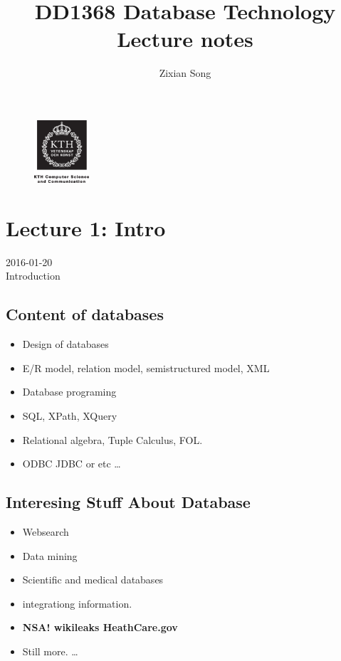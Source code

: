 \documentclass[a4paper]{article}
\title{DD1368 Database Technology Lecture notes}
\author{Zixian Song}
\begin{document}
\maketitle

\begin{figure}[b] 
\centering 
\includegraphics[width=2.045cm,height=2.335cm]{kth_svv_comp_science.eps}
\end{figure}
\newpage
\tableofcontents
\newpage

\section{Lecture 1: Intro}
2016-01-20 \\
    Introduction
    \subsection{Content of databases}
        \begin{itemize}
            \item Design of databases 
            \item E/R  model, relation model, semistructured model, XML
  
        \item Database programing 
        \item SQL, XPath, XQuery 
        \item Relational algebra, Tuple Calculus, FOL. 
        \item ODBC JDBC or etc \ldots
        \end{itemize}
    \subsection{Interesing Stuff About Database}
        \begin{itemize}
            \item Websearch 
            \item Data mining 
            \item Scientific and medical databases 
            \item integrationg information. 
            \item \textbf{NSA! wikileaks HeathCare.gov} 
            \item Still more. \ldots
        \end{itemize}
\end{document}
